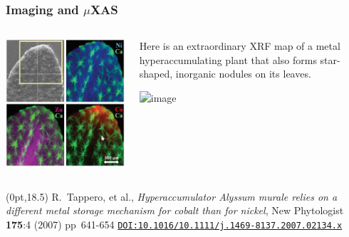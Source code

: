 \documentclass[10pt, xcolor=x11names, compress]{beamer}
\begin{document}
\begin{frame}
  \frametitle{Imaging and $\mu$XAS}
  \begin{columns}[T]
    \begin{column}{0.4\linewidth}
      \includegraphics[width=\linewidth]{images/xrfmap.png}
    \end{column}
    \begin{column}{0.6\linewidth}
      Here is an extraordinary XRF map of a metal hyperaccumulating
      plant that also forms star-shaped, inorganic nodules on its
      leaves.  
      
      \smallskip

      \begin{overlayarea}{\linewidth}{9ex}
      \end{overlayarea}

      \begin{overlayarea}{\linewidth}{9ex}
        \begin{center}
          \includegraphics<2>[width=0.8\linewidth]{images/xrfxas.png}
        \end{center}
      \end{overlayarea}

    \end{column}
  \end{columns}
  \begin{textblock*}{0.4\linewidth}(0pt,18.5\TPVertModule)%
    \tiny%
    R.\ Tappero, et al., \textit{Hyperaccumulator Alyssum murale
      relies on a different metal storage mechanism for cobalt than
      for nickel}, New Phytologist \textbf{175}:4
    (2007) pp\ 641-654
    \href{http://dx.doi.org/10.1111/j.1469-8137.2007.02134.x}
    {\color{Blue4}\texttt{DOI:10.1016/10.1111/j.1469-8137.2007.02134.x}}
  \end{textblock*}
\end{frame}
\end{document}
